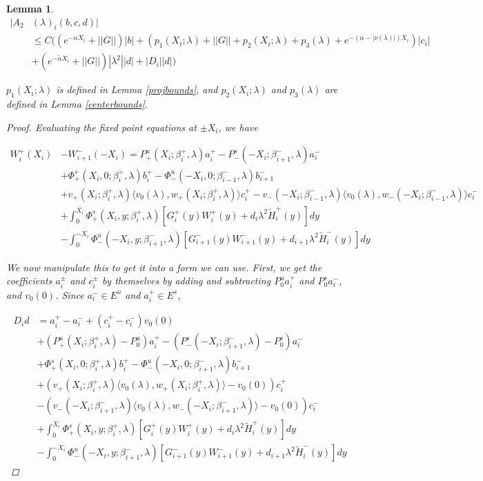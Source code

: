\documentclass[12pt]{article}
\newtheorem{lemma}{Lemma}
\begin{document}
\begin{lemma}
\begin{align*}
|A_2&(\lambda)_i(b, c, d)| \\
&\leq C \Big( (e^{-\alpha X_i} + ||G||)|b| + (p_1(X_i; \lambda) + ||G|| + p_2(X_i; \lambda) + p_3(\lambda) + e^{-(\alpha - |\nu(\lambda)|)X_i})|c_i| \\
&+ (e^{-\tilde{\alpha} X_i} + ||G||) |\lambda^2| |d| + |D_i||d|\Big)
\end{align*}

$p_1(X_i; \lambda)$ is defined in Lemma \ref{projbounds}, and $p_2(X_i; \lambda)$ and $p_3(\lambda)$ are defined in Lemma \ref{centerbounds}. 

\begin{proof}

Evaluating the fixed point equations at $\pm X_i$, we have

\begin{align*}
W_i^+(X_i) &- W_{i+1}^-(-X_i) = P^u_+(X_i; \beta_i^+, \lambda) a_i^+ - P^s_-(-X_i; \beta_{i+1}^-, \lambda) a_i^- \\
&+ \Phi^s_+(X_i, 0; \beta_i^+, \lambda)b_i^+ - \Phi^u_-(-X_i, 0; \beta_{i-1}^-, \lambda)b_{i+1}^- \\
&+ v_+(X_i; \beta_i^+, \lambda) \langle v_0(\lambda), w_+(X_i; \beta_i^+, \lambda) \rangle c_i^+ - v_-(-X_i; \beta_{i-1}^-, \lambda) \langle v_0(\lambda), w_-(-X_i; \beta_{i-1}^-, \lambda) \rangle c_i^- \\
&+ \int_0^{X_i} \Phi^s_+(X_i, y; \beta_i^+, \lambda) [ G_i^+(y) W_i^+(y) + d_i \lambda^2 \tilde{H}_i^+(y) ] dy \\
&- \int_0^{-X_i} \Phi^u_-(-X_i, y; \beta_{i+1}^-, \lambda) [ G_{i+1}^-(y) W_{i+1}^-(y) + d_{i+1} \lambda^2 \tilde{H}_i^-(y) ] dy
\end{align*}

We now manipulate this to get it into a form we can use. First, we get the coefficients $a_i^\pm$ and $c_i^\pm$ by themselves by adding and subtracting $P_0^u a_i^+$ and $P_0^s a_i^-$, and $v_0(0)$. Since $a_i^- \in E^u$ and $a_i^+ \in E^s$, 

\begin{align*}
D_i d &= a_i^+ - a_i^- + (c_i^+ - c_i^-)v_0(0) \\
&+ (P^u_+(X_i; \beta_i^+, \lambda) - P_0^u)a_i^+ - (P^s_-(-X_i; \beta_{i+1}^-, \lambda) - P_0^s)a_i^- \\
&+ \Phi^s_+(X_i, 0; \beta_i^+, \lambda)b_i^+ - \Phi^u_-(-X_i, 0; \beta_{i+1}^-, \lambda)b_{i+1}^- \\
&+ (v_+(X_i; \beta_i^+, \lambda) \langle v_0(\lambda), w_+(X_i; \beta_i^+, \lambda) \rangle - v_0(0) ) c_i^+ \\
&- (v_-(-X_i; \beta_{i+1}^-, \lambda) \langle v_0(\lambda), w_-(-X_i; \beta_{i+1}^-, \lambda) \rangle - v_0(0) ) c_i^- \\
&+ \int_0^{X_i} \Phi^s_+(X_i, y; \beta_i^+, \lambda) [ G_i^+(y) W_i^+(y) + d_i \lambda^2 \tilde{H}_i^+(y) ] dy \\
&- \int_0^{-X_i} \Phi^u_-(-X_i, y; \beta_{i+1}^-, \lambda) [ G_{i+1}^-(y) W_{i+1}^-(y) + d_{i+1} \lambda^2 \tilde{H}_i^-(y) ] dy
\end{align*}


\end{proof}
\end{lemma}
\end{document}
